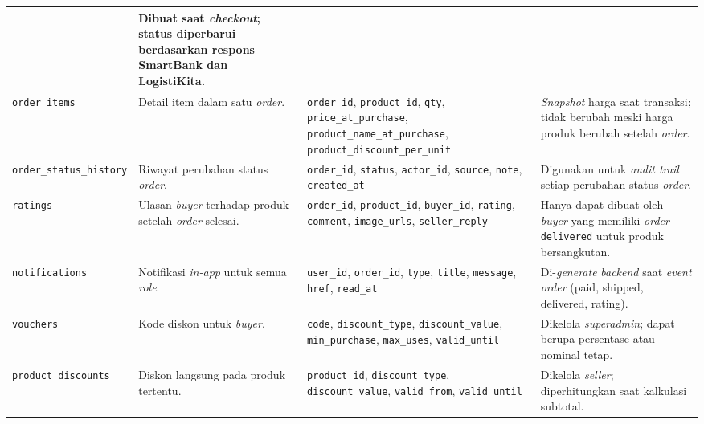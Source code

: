 \begin{longtable}{|L{2.8cm}|L{3cm}|L{4.7cm}|L{4cm}|}
        & Dibuat saat \textit{checkout}; status diperbarui berdasarkan respons
          SmartBank dan LogistiKita. \\
    \hline
    \texttt{order\_items}
        & Detail item dalam satu \textit{order}.
        & \texttt{order\_id}, \texttt{product\_id}, \texttt{qty},
          \texttt{price\_at\_purchase}, \texttt{product\_name\_at\_purchase},
          \texttt{product\_discount\_per\_unit}
        & \textit{Snapshot} harga saat transaksi; tidak berubah meski harga
          produk berubah setelah \textit{order}. \\
    \hline
    \texttt{order\_status\_}\newline\texttt{history}
        & Riwayat perubahan status \textit{order}.
        & \texttt{order\_id}, \texttt{status}, \texttt{actor\_id},
          \texttt{source}, \texttt{note}, \texttt{created\_at}
        & Digunakan untuk \textit{audit trail} setiap perubahan status \textit{order}. \\
    \hline
    \texttt{ratings}
        & Ulasan \textit{buyer} terhadap produk setelah \textit{order} selesai.
        & \texttt{order\_id}, \texttt{product\_id}, \texttt{buyer\_id},
          \texttt{rating}, \texttt{comment}, \texttt{image\_urls},
          \texttt{seller\_reply}
        & Hanya dapat dibuat oleh \textit{buyer} yang memiliki \textit{order}
          \texttt{delivered} untuk produk bersangkutan. \\
    \hline
    \texttt{notifications}
        & Notifikasi \textit{in-app} untuk semua \textit{role}.
        & \texttt{user\_id}, \texttt{order\_id}, \texttt{type}, \texttt{title},
          \texttt{message}, \texttt{href}, \texttt{read\_at}
        & Di-\textit{generate} \textit{backend} saat \textit{event order}
          (paid, shipped, delivered, rating). \\
    \hline
    \texttt{vouchers}
        & Kode diskon untuk \textit{buyer}.
        & \texttt{code}, \texttt{discount\_type}, \texttt{discount\_value},
          \texttt{min\_purchase}, \texttt{max\_uses}, \texttt{valid\_until}
        & Dikelola \textit{superadmin}; dapat berupa persentase atau nominal tetap. \\
    \hline
    \texttt{product\_discounts}
        & Diskon langsung pada produk tertentu.
        & \texttt{product\_id}, \texttt{discount\_type}, \texttt{discount\_value},
          \texttt{valid\_from}, \texttt{valid\_until}
        & Dikelola \textit{seller}; diperhitungkan saat kalkulasi subtotal. \\
    \hline

\end{longtable}
